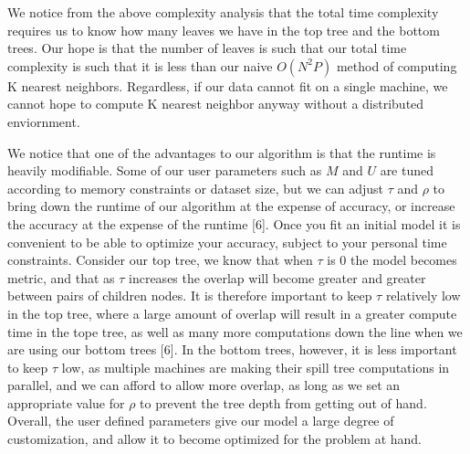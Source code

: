 \vspace{5 mm}
\noindent
We notice from the above complexity analysis that the total time complexity 
requires us to know how many leaves we have in the top tree and the bottom 
trees. Our hope is that the number of leaves is such that our total time 
complexity is such that it is less than our naive $O(N^{2} P)$ method of 
computing K nearest neighbors. Regardless, if our data cannot fit on a single 
machine, we cannot hope to compute K nearest neighbor anyway without a 
distributed enviornment.

\vspace{5 mm}
\noindent
We notice that one of the advantages to our algorithm is that the runtime is heavily 
modifiable.  Some of our user parameters such as $M$ and $U$ are tuned according
to memory constraints or dataset size, but we can adjust $\tau$ and $\rho$ to 
bring down the runtime of our algorithm at the expense of accuracy, or increase 
the accuracy at the expense of the runtime [6].  Once you fit an initial model it is 
convenient to be able to optimize your accuracy, subject to your personal time 
constraints.  Consider our top tree, we know that when $\tau$ is 0 the model 
becomes metric, and that as $\tau$ increases the overlap will become greater and 
greater between pairs of children nodes.  It is therefore important to keep 
$\tau$ relatively low in the top tree, where a large amount of overlap will 
result in a greater compute time in the tope tree, as well as many more 
computations down the line when we are using our bottom trees [6].  In the bottom 
trees, however, it is less important to keep $\tau$ low, as multiple machines 
are making their spill tree computations in parallel, and we can afford to allow 
more overlap, as long as we set an appropriate value for $\rho$ to prevent the 
tree depth from getting out of hand.  Overall, the user defined parameters give 
our model a large degree of customization, and allow it to become optimized for 
the problem at hand.
